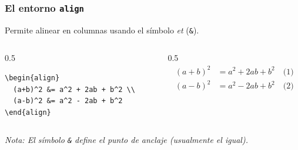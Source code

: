 \documentclass[12pt,aspectratio=169,ignorenonframetext]{ltxbeamer}
\begin{document}
\begin{frame}[fragile]
\frametitle{El entorno \texttt{align}}

Permite alinear en columnas usando el símbolo \emph{et} (\texttt{\&}).

\begin{columns}
    \begin{column}{0.5\textwidth}
        \begin{verbatim}
\begin{align}
  (a+b)^2 &= a^2 + 2ab + b^2 \\
  (a-b)^2 &= a^2 - 2ab + b^2
\end{align}
        \end{verbatim}
    \end{column}
    {\color{gray} \vline}
    \begin{column}{0.5\textwidth}
        \lmr
        \begin{displaymath}
            \begin{aligned}
                (a+b)^2 &= a^2 + 2ab + b^2 \quad \text{(1)} \\
                (a-b)^2 &= a^2 - 2ab + b^2 \quad \text{(2)}
            \end{aligned}
        \end{displaymath}
    \end{column}
\end{columns}

\bigskip

\small \textit{Nota: El símbolo \texttt{\&} define el punto de anclaje (usualmente el igual).}
\end{frame}
\end{document}
